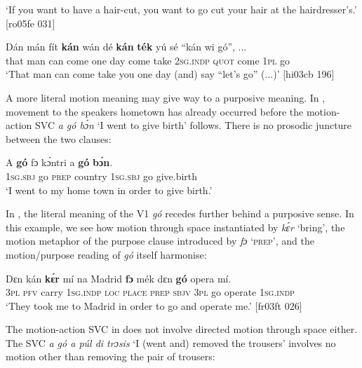 \glt ‘If you want to have a hair-cut, you want to go cut your hair at the hairdresser’s.’
[ro05fe 031]
\z


\ea%
    \label{ex:key:1557}
    \gll Dán  mán    fít  \textbf{kán}    wán  dé  \textbf{kán}    \textbf{ték}    yú    sé   
 “kán  wi  gó”,  \op...\cp{}\\
that  man    can  come  one  day  come  take    \textsc{2sg.indp}  \textsc{quot}     
  come  \textsc{1pl}  go\\

\glt ‘That man can come take you one day (and) say “let’s go” (...)’ [hi03cb 196]
\z

A more literal motion meaning may give way to a purposive meaning. In , movement to the speakers hometown has already occurred before the motion-action SVC \textit{a gó bɔ́n} ‘I went to give birth’ follows. There is no prosodic juncture between the two clauses:


\ea%
    \label{ex:key:1558}
    \gll A    \textbf{gó}  fɔ  kɔ́ntri  a    \textbf{gó}  \textbf{bɔ́n}.\\
\textsc{1sg.sbj}  go  \textsc{prep}  country  \textsc{1sg.sbj}  go  give.birth\\

\glt ‘I went to my home town in order to give birth.’
\z

In , the literal meaning of the V1 \textit{gó} recedes further behind a purposive sense. In this example, we see how motion through space instantiated by \textit{kɛ́r} ‘bring’, the motion metaphor of the purpose clause{\fff} introduced by \textit{fɔ} ‘\textsc{prep}’, and the motion/purpose reading of \textit{gó} itself harmonise:


\ea%
    \label{ex:key:1559}
    \gll Dɛn  kán  \textbf{kɛ́r}    mí    na  Madrid  \textbf{fɔ}  mék    dɛn  \textbf{gó}  opera  mí.\\
\textsc{3pl}  \textsc{pfv}  carry  \textsc{1sg.indp}  \textsc{loc}  \textsc{place}  \textsc{prep}  \textsc{sbjv}    \textsc{3pl}  go  operate  \textsc{1sg.indp}\\

\glt ‘They took me to Madrid in order to go and operate me.’ [fr03ft 026]
\z

The motion-action SVC in  does not involve directed motion through space either. The SVC \textit{a gó a púl di trɔsis} ‘I (went and) removed the trousers’ involves no motion other than removing the pair of trousers:


